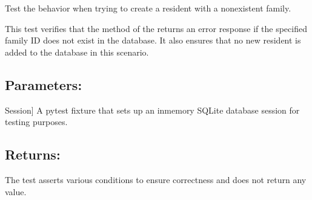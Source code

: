 \documentclass[letterpaper,10pt,english]{sphinxmanual}
\begin{document}
\begin{fulllineitems}
\label{\detokenize{test:test.test_residetnt.test_create_resident_family_not_exist}}
\pysigstartsignatures
\pysiglinewithargsret
{}
{}
{}
\pysigstopsignatures
\sphinxAtStartPar
Test the behavior when trying to create a resident with a nonexistent family.

\sphinxAtStartPar
This test verifies that the  method of the 
returns an error response if the specified family ID does not exist in the database.
It also ensures that no new resident is added to the database in this scenario.


\subsection{Parameters:}
\label{\detokenize{test:id3}}\begin{description}
\sphinxlineitem{setup\_database}{[}Session{]}
\sphinxAtStartPar
A pytest fixture that sets up an in\sphinxhyphen{}memory SQLite database session
for testing purposes.

\end{description}


\subsection{Returns:}
\label{\detokenize{test:id4}}\begin{description}
\sphinxAtStartPar
The test asserts various conditions to ensure correctness and does not
return any value.

\end{description}

\end{fulllineitems}

\end{document}
